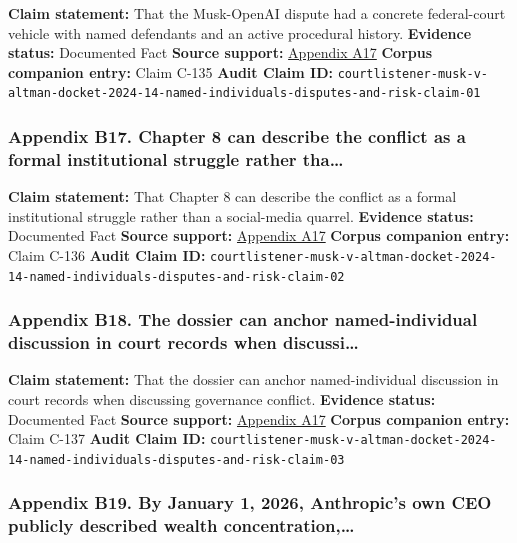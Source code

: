 \documentclass[
  american,
  11pt,
  letterpaper,
]{article}
\begin{document}
\textbf{Claim statement:} That the Musk-OpenAI dispute had a concrete
federal-court vehicle with named defendants and an active procedural
history. \textbf{Evidence status:} Documented Fact \textbf{Source
support:} \hyperref[appendix-a17-musk-v-altman-4-24-cv-04722]{Appendix
A17} \textbf{Corpus companion entry:} Claim C-135 \textbf{Audit Claim
ID:}
\texttt{courtlistener-musk-v-altman-docket-2024-14-named-individuals-disputes-and-risk-claim-01}

\subsubsection{Appendix B17. Chapter 8 can describe the conflict as a
formal institutional struggle rather
tha\ldots{}}\label{appendix-b17-chapter-8-can-describe-the-conflict-as-a-formal-institutional-struggle-rather-tha}

\textbf{Claim statement:} That Chapter 8 can describe the conflict as a
formal institutional struggle rather than a social-media quarrel.
\textbf{Evidence status:} Documented Fact \textbf{Source support:}
\hyperref[appendix-a17-musk-v-altman-4-24-cv-04722]{Appendix A17}
\textbf{Corpus companion entry:} Claim C-136 \textbf{Audit Claim ID:}
\texttt{courtlistener-musk-v-altman-docket-2024-14-named-individuals-disputes-and-risk-claim-02}

\subsubsection{Appendix B18. The dossier can anchor named-individual
discussion in court records when
discussi\ldots{}}\label{appendix-b18-the-dossier-can-anchor-named-individual-discussion-in-court-records-when-discussi}

\textbf{Claim statement:} That the dossier can anchor named-individual
discussion in court records when discussing governance conflict.
\textbf{Evidence status:} Documented Fact \textbf{Source support:}
\hyperref[appendix-a17-musk-v-altman-4-24-cv-04722]{Appendix A17}
\textbf{Corpus companion entry:} Claim C-137 \textbf{Audit Claim ID:}
\texttt{courtlistener-musk-v-altman-docket-2024-14-named-individuals-disputes-and-risk-claim-03}

\subsubsection{Appendix B19. By January 1, 2026, Anthropic's own CEO
publicly described wealth
concentration,\ldots{}}\label{appendix-b19-by-january-1-2026-anthropic-s-own-ceo-publicly-described-wealth-concentration}
\end{document}
